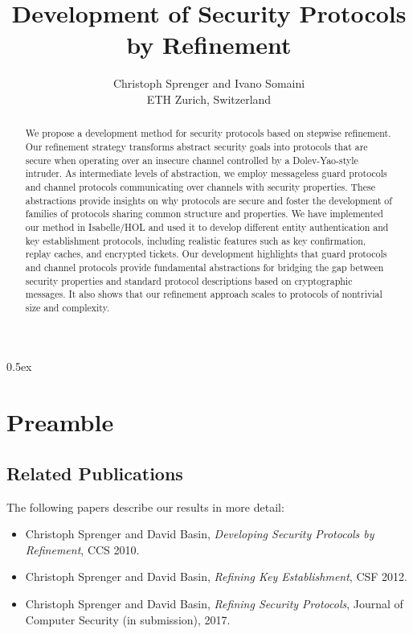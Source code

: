 \documentclass[11pt,a4paper]{report}
\begin{document}
\title{Development of Security Protocols by Refinement}
\author{Christoph Sprenger and Ivano Somaini \\[.5ex]
ETH Zurich, Switzerland}
\maketitle

\begin{abstract}
We propose a development method for security protocols based on stepwise refinement. Our refinement strategy transforms abstract security goals into protocols that are secure when operating over an insecure channel controlled by a Dolev-Yao-style intruder. As intermediate levels of abstraction, we employ messageless guard protocols and channel protocols communicating over channels with security properties. These abstractions provide insights on why protocols are secure and foster the development of families of protocols sharing common structure and properties. We have implemented our method in Isabelle/HOL and used it to develop different entity authentication and key establishment protocols, including realistic features such as key confirmation, replay caches, and encrypted tickets. Our development highlights that guard protocols and channel protocols provide fundamental abstractions for bridging the gap between security properties and standard protocol descriptions based on cryptographic messages. It also shows that our refinement approach scales to protocols of nontrivial size and complexity.
\end{abstract}

\tableofcontents

\parindent 0pt\parskip 0.5ex



\section*{Preamble}

\subsection*{Related Publications}

The following papers describe our results in more detail:
\begin{itemize}
\item Christoph Sprenger and David Basin,
  \emph{Developing Security Protocols by Refinement}, CCS 2010.

\item Christoph Sprenger and David Basin,
  \emph{Refining Key Establishment}, CSF 2012.

\item Christoph Sprenger and David Basin,
  \emph{Refining Security Protocols},
  Journal of Computer Security (in submission), 2017.
\end{itemize}
  
\end{document}
